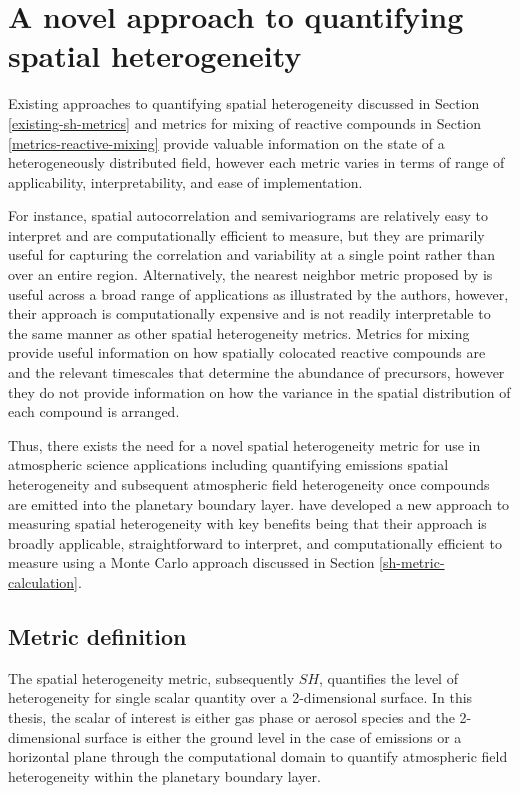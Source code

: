 \section{A novel approach to quantifying spatial heterogeneity}
Existing approaches to quantifying spatial heterogeneity discussed in Section \ref{existing-sh-metrics} and metrics for mixing of reactive compounds in Section \ref{metrics-reactive-mixing} provide valuable information on the state of a heterogeneously distributed field, however each metric varies in terms of range of applicability, interpretability, and ease of implementation. 

For instance, spatial autocorrelation and semivariograms are relatively easy to interpret and are computationally efficient to measure, but they are primarily useful for capturing the correlation and variability at a single point rather than over an entire region. Alternatively, the nearest neighbor metric proposed by \textcite{shu_quantifying_2019} is useful across a broad range of applications as illustrated by the authors, however, their approach is computationally expensive and is not readily interpretable to the same manner as other spatial heterogeneity metrics. Metrics for mixing provide useful information on how spatially colocated reactive compounds are and the relevant timescales that determine the abundance of precursors, however they do not provide information on how the variance in the spatial distribution of each compound is arranged. 

Thus, there exists the need for a novel spatial heterogeneity metric for use in atmospheric science applications including quantifying emissions spatial heterogeneity and subsequent atmospheric field heterogeneity once compounds are emitted into the planetary boundary layer. \textcite{mohebalhojeh_2024} have developed a new approach to measuring spatial heterogeneity with key benefits being that their approach is broadly applicable, straightforward to interpret, and computationally efficient to measure using a Monte Carlo approach discussed in Section \ref{sh-metric-calculation}.

\subsection{Metric definition}
The spatial heterogeneity metric, subsequently $SH$, quantifies the level of heterogeneity for single scalar quantity over a 2-dimensional surface. In this thesis, the scalar of interest is either gas phase or aerosol species and the 2-dimensional surface is either the ground level in the case of emissions or a horizontal plane through the computational domain to quantify atmospheric field heterogeneity within the planetary boundary layer.

